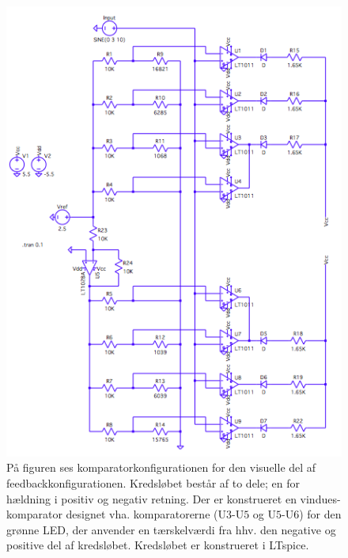\begin{figure}[H] 
	\centering
	\includegraphics[scale=0.7]{figures/cProblemloesning/komparator_visuel1.PNG}
	\caption{På figuren ses komparatorkonfigurationen for den visuelle del af feedbackkonfigurationen. Kredsløbet består af to dele; en for hældning i positiv og negativ retning. Der er konstrueret en vindues-komparator designet vha. komparatorerne (U$3$-U$5$ og U$5$-U$6$) for den grønne LED, der anvender en tærskelværdi fra hhv. den negative og positive del af kredsløbet. Kredsløbet er konstrueret i LTspice.}
	\label{fig:komparator_visuel}
\end{figure}


